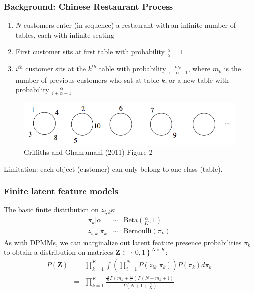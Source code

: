 \documentclass[13pt]{beamer}
\begin{document}
\begin{frame}
\frametitle{Background: Chinese Restaurant Process}

\begin{enumerate}
\item $N$ customers enter (in sequence) a restaurant with an infinite number of tables, each with infinite seating
\item First customer sits at first table with probability $\frac{\alpha}{\alpha}=1$
\item $i^{th}$ customer sits at the $k^{th}$ table with probability $\frac{m_k}{i+\alpha-1}$, where $m_k$ is the number of previous customers who sat at table $k$, or a new table with probability $\frac{\alpha}{i+\alpha-1}$
\end{enumerate}

\begin{figure}
\begin{center}
\includegraphics[scale=0.3]{./img/crp-example.png}
\caption{Griffiths and Ghahramani (2011) Figure 2}
\end{center}
\end{figure}

Limitation: each object (customer) can only belong to one class (table).

\end{frame}
\begin{frame}
\frametitle{Finite latent feature models}
The basic finite distribution on $z_{i,k}$s: 
\begin{eqnarray*}
    \pi_k | \alpha &\sim& \text{Beta}(\frac{\alpha}{K}, 1) \\
    z_{i,k} | \pi_k &\sim& \text{Bernoulli}(\pi_k)
\end{eqnarray*}
As with DPMMs, we can marginalize out latent feature presence probabilities $\pi_k$ to obtain a distribution on matrices $\mathbf{Z} \in \left\{ 0,1 \right\}^{N \times K}$:
\begin{eqnarray*}
    P(\mathbf{Z}) &=& \prod_{k=1}^K \int \left( \prod_{i=1}^N P(z_{ik} | \pi_k) \right) P(\pi_k) d \pi_k \\
    &=& \prod_{k=1}^K \frac{ \frac{\alpha}{K} \Gamma(m_k + \frac{\alpha}{K} ) \Gamma(N - m_k + 1) }{\Gamma(N + 1 + \frac{\alpha}{K}) }
\end{eqnarray*}
\end{frame}
\end{document}
